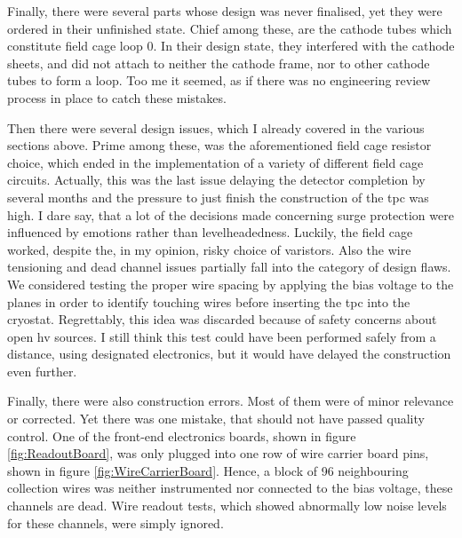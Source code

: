 Finally, there were several parts whose design was never finalised, yet they were ordered in their unfinished state. Chief among these, are the cathode tubes which constitute field cage loop \num{0}. In their design state, they interfered with the cathode sheets, and did not attach to neither the cathode frame, nor to other cathode tubes to form a loop. Too me it seemed, as if there was no engineering review process in place to catch these mistakes.

Then there were several design issues, which I already covered in the various sections above. Prime among these, was the aforementioned field cage resistor choice, which ended in the implementation of a variety of different field cage circuits. Actually, this was the last issue delaying the detector completion by several months and the pressure to just finish the construction of the \gls{tpc} was high. I dare say, that a lot of the decisions made concerning surge protection were influenced by emotions rather than levelheadedness. Luckily, the field cage worked, despite the, in my opinion, risky choice of varistors. Also the wire tensioning and dead channel issues partially fall into the category of design flaws. We considered testing the proper wire spacing by applying the bias voltage to the planes in order to identify touching wires before inserting the \gls{tpc} into the cryostat. Regrettably, this idea was discarded because of safety concerns about open \gls{hv} sources. I still think this test could have been performed safely from a distance, using designated electronics, but it would have delayed the construction even further.

Finally, there were also construction errors. Most of them were of minor relevance or corrected. Yet there was one mistake, that should not have passed quality control. One of the front-end electronics boards, shown in figure \ref{fig:ReadoutBoard}, was only plugged into one row of wire carrier board pins, shown in figure \ref{fig:WireCarrierBoard}. Hence, a block of \num{96} neighbouring collection wires was neither instrumented nor connected to the bias voltage, \ie these channels are dead. Wire readout tests, which showed abnormally low noise levels for these channels, were simply ignored.

